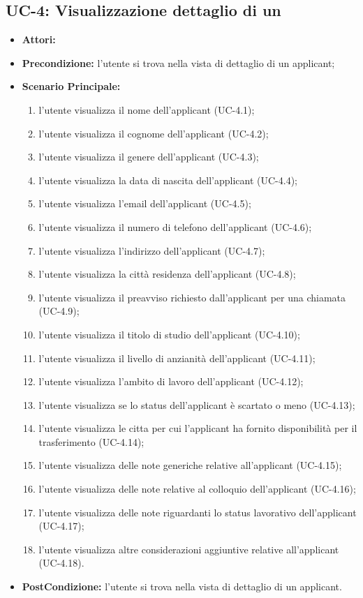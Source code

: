 \subsection{UC-4: Visualizzazione dettaglio di un \applicant }
\begin{itemize}
	\item \textbf{Attori:} \loggedusr
	\item \textbf{Precondizione:}  l'utente si trova nella vista di dettaglio di un applicant;
	\item \textbf{Scenario Principale:}
	\begin{enumerate}
		\item l'utente visualizza il nome dell'applicant (UC-4.1); 
		\item l'utente visualizza il cognome dell'applicant (UC-4.2);
		\item l'utente visualizza il genere dell'applicant (UC-4.3);
		\item l'utente visualizza la data di nascita dell'applicant (UC-4.4);
		\item l'utente visualizza l'email dell'applicant (UC-4.5);
		\item l'utente visualizza il numero di telefono dell'applicant (UC-4.6);	
		\item l'utente visualizza l'indirizzo dell'applicant (UC-4.7);
		\item l'utente visualizza la città residenza dell'applicant (UC-4.8);
		\item l'utente visualizza il preavviso richiesto dall'applicant per una chiamata (UC-4.9);
		\item l'utente visualizza il titolo di studio dell'applicant (UC-4.10);
		\item l'utente visualizza il livello di anzianità dell'applicant (UC-4.11);
		\item l'utente visualizza l'ambito di lavoro dell'applicant (UC-4.12);
		\item l'utente visualizza se lo status dell'applicant è scartato o meno (UC-4.13);
		\item l'utente visualizza le citta per cui l'applicant ha fornito disponibilità per il trasferimento (UC-4.14);
		\item l'utente visualizza delle note generiche relative all'applicant (UC-4.15);
		\item l'utente visualizza delle note relative al colloquio dell'applicant (UC-4.16);
		\item l'utente visualizza delle note riguardanti lo status lavorativo dell'applicant (UC-4.17);
		\item l'utente visualizza altre considerazioni aggiuntive relative all'applicant (UC-4.18).
	\end{enumerate}
	\item \textbf{PostCondizione:}  l'utente si trova nella vista di dettaglio di un applicant.
\end{itemize}

